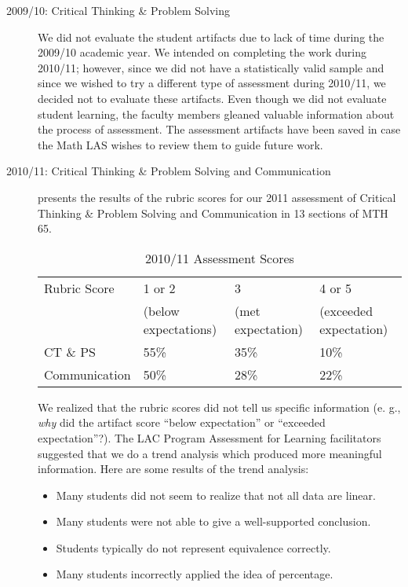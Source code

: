 \begin{description}
	\item[2009/10: Critical Thinking \& Problem Solving]
		We did not evaluate the student artifacts due to lack of time during the 2009/10
		academic year.
		We intended on completing the work during 2010/11; however, since we did not have a statistically valid sample and since we wished to try a different type of assessment during 2010/11, we decided not to evaluate these artifacts.
		Even though we did not evaluate student learning, the faculty members gleaned valuable information about the process of assessment.
		The assessment artifacts have been saved in case the Math LAS wishes to review them to guide future work.
	\item[2010/11:  Critical Thinking \& Problem Solving and Communication]
		 presents the results of the rubric scores for our
		2011 assessment of Critical Thinking \& Problem Solving and Communication in 13
		sections of MTH 65.
		\begin{table}[!htb]
			\centering
			\caption{2010/11 Assessment Scores}\label{ass:tab:201011scores}
			\begin{tabularx}{\linewidth}{Xlll}
				\toprule
				Rubric Score  & 1 or 2               & 3                 & 4 or 5                 \\
				              & (below expectations) & (met expectation) & (exceeded expectation) \\
				\midrule
				CT \& PS      & 55\%                 & 35\%              & 10\%                   \\
				Communication & 50\%                 & 28\%              & 22\%                   \\
				\bottomrule
			\end{tabularx}
		\end{table}

		We realized that the rubric scores did not tell us specific information (e.
		g.,
		\emph{why} did the artifact score ``below expectation'' or ``exceeded
		expectation''?).
		The LAC Program Assessment for Learning  facilitators suggested that we do a trend analysis which produced more meaningful information.
		Here are some results of the trend analysis: \begin{itemize} \item Many students did not seem to realize that not all data are linear.
			\item Many students were not able to give a well-supported conclusion.
			\item Students typically do not represent equivalence correctly.
			\item Many students incorrectly applied the idea of percentage.
		\end{itemize}


\end{description}
